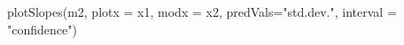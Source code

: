 \begin{Schunk}
\begin{Sinput}
 plotSlopes(m2, plotx = x1, modx = x2, predVals="std.dev.", interval = "confidence")
\end{Sinput}
\end{Schunk}
